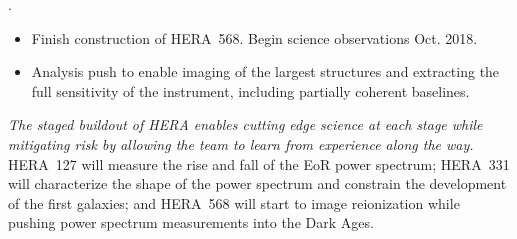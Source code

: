 \documentclass[preprint]{aastex}
\begin{document}
.
\begin{itemize}\setlength{\parskip}{0pt}\itemsep0pt
\vspace{-7pt}
  \item Finish construction of HERA~568. Begin science observations Oct. 2018.
  \item Analysis push to enable imaging of the largest structures and extracting the full sensitivity of 
the instrument, including partially coherent baselines. 
\end{itemize}




\noindent
{\it The staged buildout of HERA enables cutting edge science at each stage while
mitigating risk by allowing the team to learn from experience along the way.}
HERA~127 will measure the rise and fall of the EoR power spectrum; HERA~331
will characterize the shape of the power spectrum and constrain the development
of the first galaxies; and HERA~568 will start to image reionization while
pushing power spectrum measurements into the Dark Ages.
\end{document}
